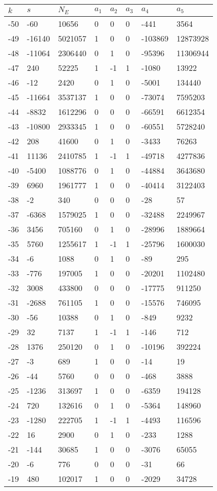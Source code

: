 \documentclass{amsart}
\begin{document}
\begin{longtable}{|l|l|l|lllll|}
\hline
$k$ & $s$ & $N_E$ & $a_1$ & $a_2$ & $a_3$ & $a_4$ & $a_5$\\
\hline
-50&-60&10656&0&0&0&-441&3564\\
-49&-16140&5021057&1&0&0&-103869&12873928\\
-48&-11064&2306440&0&1&0&-95396&11306944\\
-47&240&52225&1&-1&1&-1080&13922\\
-46&-12&2420&0&1&0&-5001&134440\\
-45&-11664&3537137&1&0&0&-73074&7595203\\
-44&-8832&1612296&0&0&0&-66591&6612354\\
-43&-10800&2933345&1&0&0&-60551&5728240\\
-42&208&41600&0&1&0&-3433&76263\\
-41&11136&2410785&1&-1&1&-49718&4277836\\
-40&-5400&1088776&0&1&0&-44884&3643680\\
-39&6960&1961777&1&0&0&-40414&3122403\\
-38&-2&340&0&0&0&-28&57\\
-37&-6368&1579025&1&0&0&-32488&2249967\\
-36&3456&705160&0&1&0&-28996&1889664\\
-35&5760&1255617&1&-1&1&-25796&1600030\\
-34&-6&1088&0&1&0&-89&295\\
-33&-776&197005&1&0&0&-20201&1102480\\
-32&3008&433800&0&0&0&-17775&911250\\
-31&-2688&761105&1&0&0&-15576&746095\\
-30&-56&10388&0&1&0&-849&9232\\
-29&32&7137&1&-1&1&-146&712\\
-28&1376&250120&0&1&0&-10196&392224\\
-27&-3&689&1&0&0&-14&19\\
-26&-44&5760&0&0&0&-468&3888\\
-25&-1236&313697&1&0&0&-6359&194128\\
-24&720&132616&0&1&0&-5364&148960\\
-23&-1280&222705&1&-1&1&-4493&116596\\
-22&16&2900&0&1&0&-233&1288\\
-21&-144&30685&1&0&0&-3076&65055\\
-20&-6&776&0&0&0&-31&66\\
-19&480&102017&1&0&0&-2029&34728\\

\end{longtable}
\end{document}
